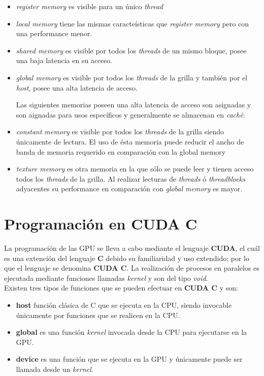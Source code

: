 \begin{itemize}
	\item  \textit{register memory} es visible para un único \textit{thread}
	\item \textit{local memory} tiene las mismas caracteísticas que \textit{register memory} pero con una performance menor.
	\item \textit{shared memory} es visible por todos los \textit{threads} de un mismo bloque, posee una baja latencia en su acceso.
	\item \textit{global memory} es visible por todos los \textit{threads} de la grilla y también por el \textit{host}, posee una alta latencia de acceso.
	
	Las siguientes memorias poseen una alta latencia de acceso son asignadas y son aignadas para usos específicos y generalmente se almacenan en \textit{caché}:
	
	\item \textit{constant memory} es visible por todos los \textit{threads} de la grilla siendo únicamente de lectura. El uso de ésta memoria puede reducir el ancho de banda de memoria requerido en comparación con la {global memory}
	\item \textit{texture memory} es otra memoria en la que sólo se puede leer y tienen acceso todos los \textit{threads} de la grilla. Al realizar lecturas de \textit{threads} ó \textit{threadblocks} adyacentes su performance en comparación con \textit{global memory} es mayor. 
	
\end{itemize}

\newpage

\section{Programación en CUDA C}

La programación de las GPU se lleva a cabo mediante el lenguaje \textbf{CUDA}, el cuál es una extención del lenguaje \textbf{C} debido su familiaridad y uso extendido; por lo que el lenguaje se denomina \textbf{CUDA C}. La realización de procesos en paralelos es ejecutada mediante funciones llamadas \textit{kernel} y son del tipo \textit{void}.
\\

Existen tres tipos de funciones que se pueden efectuar en \textbf{CUDA C} y son:

\begin{itemize}
	
	\item \textbf{host} función clásica de C que se ejecuta en la CPU, siendo invocable únicamente por funciones que se realicen en la CPU. 

	\item \textbf{global} es una función \textit{kernel} invocada desde la CPU para ejecutarse en la GPU. 
	
	\item \textbf{device} es una función que se ejecuta en la GPU y únicamente puede ser llamada desde un \textit{kernel}.
	
\end{itemize}

